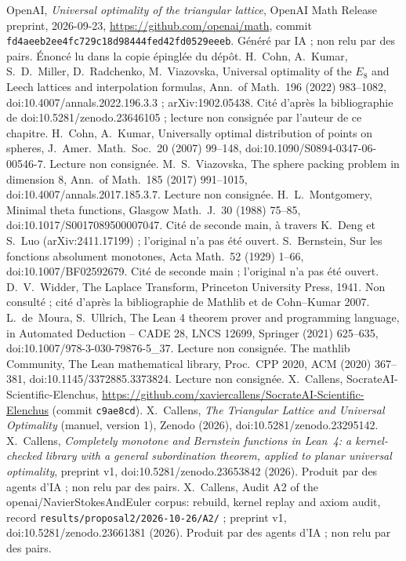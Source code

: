  OpenAI, \emph{Universal optimality of the triangular lattice}, OpenAI Math Release preprint, 2026-09-23, \url{https://github.com/openai/math}, commit \texttt{fd4aeeb2ee4fc729c18d98444fed42fd0529eeeb}. Généré par IA ; non relu par des pairs. Énoncé lu dans la copie épinglée du dépôt.
 H.~Cohn, A.~Kumar, S.~D.~Miller, D.~Radchenko, M.~Viazovska, Universal optimality of the $E_8$ and Leech lattices and interpolation formulas, Ann.\ of Math.\ 196 (2022) 983--1082, doi:10.4007/annals.2022.196.3.3 ; arXiv:1902.05438. Cité d'après la bibliographie de doi:10.5281/zenodo.23646105 ; lecture non consignée par l'auteur de ce chapitre.
 H.~Cohn, A.~Kumar, Universally optimal distribution of points on spheres, J.\ Amer.\ Math.\ Soc.\ 20 (2007) 99--148, doi:10.1090/S0894-0347-06-00546-7. Lecture non consignée.
 M.~S.~Viazovska, The sphere packing problem in dimension 8, Ann.\ of Math.\ 185 (2017) 991--1015, doi:10.4007/annals.2017.185.3.7. Lecture non consignée.
 H.~L.~Montgomery, Minimal theta functions, Glasgow Math.\ J.\ 30 (1988) 75--85, doi:10.1017/S0017089500007047. Cité de seconde main, à travers K.~Deng et S.~Luo (arXiv:2411.17199) ; l'original n'a pas été ouvert.
 S.~Bernstein, Sur les fonctions absolument monotones, Acta Math.\ 52 (1929) 1--66, doi:10.1007/BF02592679. Cité de seconde main ; l'original n'a pas été ouvert.
 D.~V.~Widder, The Laplace Transform, Princeton University Press, 1941. Non consulté ; cité d'après la bibliographie de Mathlib et de Cohn--Kumar 2007.
 L.~de~Moura, S.~Ullrich, The Lean 4 theorem prover and programming language, in Automated Deduction -- CADE 28, LNCS 12699, Springer (2021) 625--635, doi:10.1007/978-3-030-79876-5\_37. Lecture non consignée.
 The mathlib Community, The Lean mathematical library, Proc.\ CPP 2020, ACM (2020) 367--381, doi:10.1145/3372885.3373824. Lecture non consignée.
 X.~Callens, SocrateAI-Scientific-Elenchus, \url{https://github.com/xaviercallens/SocrateAI-Scientific-Elenchus} (commit \texttt{c9ae8cd}).
 X.~Callens, \emph{The Triangular Lattice and Universal Optimality} (manuel, version 1), Zenodo (2026), doi:10.5281/zenodo.23295142.
 X.~Callens, \emph{Completely monotone and Bernstein functions in Lean~4: a kernel-checked library with a general subordination theorem, applied to planar universal optimality}, preprint v1, doi:10.5281/zenodo.23653842 (2026). Produit par des agents d'IA ; non relu par des pairs.
 X.~Callens, Audit A2 of the openai/NavierStokesAndEuler corpus: rebuild, kernel replay and axiom audit, record \texttt{results/proposal2/2026-10-26/A2/} ; preprint v1, doi:10.5281/zenodo.23661381 (2026). Produit par des agents d'IA ; non relu par des pairs.
